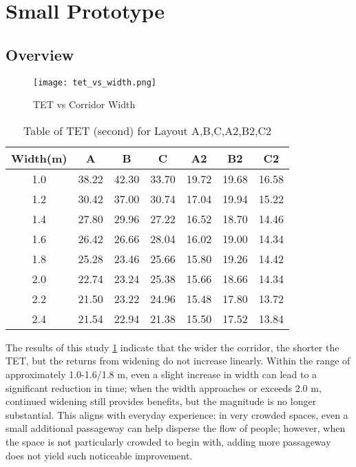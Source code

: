 \section{Small Prototype}
\subsection{Overview}
\begin{figure}[h]
    \centering
    \texttt{[image: tet\_vs\_width.png]}
    \caption{TET vs Corridor Width}
    \label{fig:tet_vs_width}
\end{figure}

\begin{table}[ht]
    \caption{Table of TET (second) for Layout A,B,C,A2,B2,C2} %
    \centering %
    \label{tab:tettable}
    \begin{tabular}{c c c c c c c} %
        \hline %
        Width(m) &  A  & B     & C     & A2    & B2    & C2  \\ [0.5ex] %
        \hline %
        1.0 & 38.22 & 42.30 & 33.70 & 19.72 & 19.68 & 16.58 \\ [1ex]
        1.2 & 30.42 & 37.00 & 30.74 & 17.04 & 19.94 & 15.22 \\ [1ex]
        1.4 & 27.80 & 29.96 & 27.22 & 16.52 & 18.70 & 14.46 \\ [1ex]
        1.6 & 26.42 & 26.66 & 28.04 & 16.02 & 19.00 & 14.34 \\ [1ex]
        1.8 & 25.28 & 23.46 & 25.66 & 15.80 & 19.26 & 14.42 \\ [1ex]
        2.0 & 22.74 & 23.24 & 25.38 & 15.66 & 18.66 & 14.34 \\ [1ex]
        2.2 & 21.50 & 23.22 & 24.96 & 15.48 & 17.80 & 13.72 \\ [1ex]
        2.4 & 21.54 & 22.94 & 21.38 & 15.50 & 17.52 & 13.84 \\ [1ex]
        \hline
    \end{tabular}
\end{table}

The results of this study \ref{fig:tet_vs_width} indicate that the wider the corridor, the shorter the TET, but the returns from widening do not increase linearly. Within the range of approximately 1.0-1.6/1.8 m, even a slight increase in width can lead to a significant reduction in time; when the width approaches or exceeds 2.0 m, continued widening still provides benefits, but the magnitude is no longer substantial. This aligns with everyday experience: in very crowded spaces, even a small additional passageway can help disperse the flow of people; however, when the space is not particularly crowded to begin with, adding more passageway does not yield such noticeable improvement.

